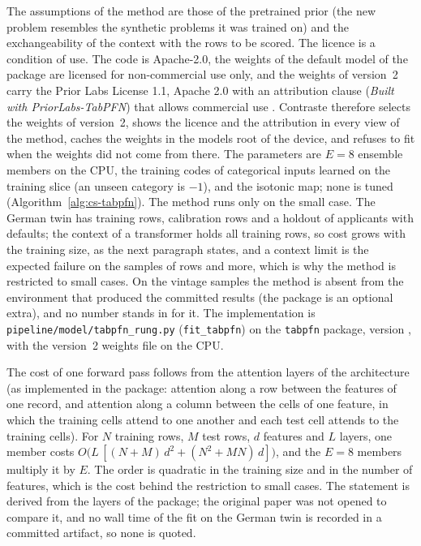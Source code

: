 The assumptions of the method are those of the pretrained prior (the new problem resembles the synthetic problems it was trained
on) and the exchangeability of the context with the rows to be scored. The licence is a condition of use. The code is Apache-2.0,
the weights of the default model of the package are licensed for non-commercial use only, and the weights of version~2 carry the
Prior Labs License 1.1, Apache 2.0 with an attribution clause (\emph{Built with PriorLabs-TabPFN}) that allows commercial use
\citep{credit-scoring:tabpfnlicence}. Contraste therefore selects the weights of version~2, shows the licence and the attribution
in every view of the method, caches the weights in the models root of the device, and refuses to fit when the weights did not
come from there. The parameters are $E=8$ ensemble members on the CPU, the training codes of categorical inputs learned on the
training slice (an unseen category is $-1$), and the isotonic map; none is tuned (Algorithm~\ref{alg:cs-tabpfn}). The method runs only on the small case. The
German twin has \csFitGeTrain{} training rows, \csFitGeCal{} calibration rows and a holdout of \csGtN{} applicants with
\csGtEvents{} defaults; the context of a transformer holds all training rows, so cost grows with the training size, as the next paragraph states, and a
context limit is the expected failure on the samples of \csFitTwTrain{} rows and more, which is why the method is restricted to
small cases.
On the vintage samples the method is absent from the environment that produced the committed results (the package is an optional
extra), and no number stands in for it. The implementation is \texttt{pipeline/model/tabpfn\_rung.py} (\texttt{fit\_tabpfn}) on
the \texttt{tabpfn} package, version \csTpVersion{}, with the version~2 weights file \texttt{\csTpWeights{}} on the CPU.

The cost of one forward pass follows from the attention layers of the architecture (as implemented in the package: attention
along a row between the features of one record, and attention along a column between the cells of one feature, in which the
training cells attend to one another and each test cell attends to the training cells). For $N$ training rows, $M$ test rows,
$d$ features and $L$ layers, one member costs $O\bigl(L\,[(N+M)\,d^{2}+(N^{2}+MN)\,d]\bigr)$, and the $E=8$ members multiply it by $E$.
The order is quadratic in the training size and in the number of features, which is the cost behind the restriction to small
cases. The statement is derived from the layers of the package; the original paper was not opened to compare it, and no wall time
of the fit on the German twin is recorded in a committed artifact, so none is quoted.

